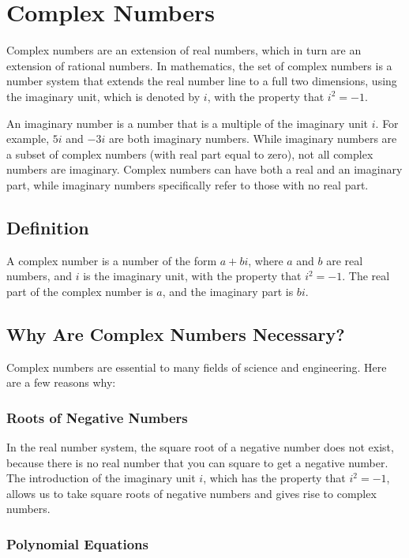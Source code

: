\chapter{Complex Numbers}

Complex numbers are an extension of real numbers, which in turn
are an extension of rational numbers. In mathematics, the set of
complex numbers is a number system that extends the real number line
to a full two dimensions, using the imaginary unit, which is denoted by
$i$, with the property that $i^2 = -1$.

An imaginary number is a number that is a multiple of the imaginary unit $i$.
For example, $5i$ and $-3i$ are both imaginary numbers. While imaginary numbers are a 
subset of complex numbers (with real part equal to zero), not all complex numbers are 
imaginary. Complex numbers can have both a real and an imaginary part, while imaginary 
numbers specifically refer to those with no real part.

\section{Definition}

A complex number is a number of the form $a + bi$, where $a$ and $b$
are real numbers, and $i$ is the imaginary unit, with the property
that $i^2 = -1$. The real part of the complex number is $a$, and the
imaginary part is $bi$.

\section{Why Are Complex Numbers Necessary?}

Complex numbers are essential to many fields of science and
engineering. Here are a few reasons why:

\subsection{Roots of Negative Numbers}

In the real number system, the square root of a negative number does
not exist, because there is no real number that you can square to get a
negative number. The introduction of the imaginary unit $i$, which has
the property that $i^2 = -1$, allows us to take square roots of
negative numbers and gives rise to complex numbers.

\subsection{Polynomial Equations}


